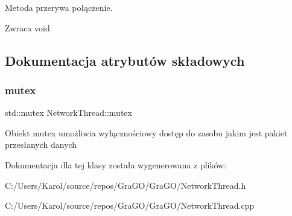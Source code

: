 Metoda przerywa połączenie. 

\begin{DoxyReturn}{Zwraca}
void 
\end{DoxyReturn}


\subsection{Dokumentacja atrybutów składowych}
\mbox{\label{class_network_thread_ab970cd7721c0a8d5189cc8d32f0c512f}} 
\subsubsection{mutex}
{\footnotesize\ttfamily std\+::mutex Network\+Thread\+::mutex}

Obiekt mutex umożliwia wyłącznościowy dostęp do zasobu jakim jest pakiet przesłanych danych 

Dokumentacja dla tej klasy została wygenerowana z plików\+:\begin{DoxyCompactItemize}
\item 
C\+:/\+Users/\+Karol/source/repos/\+Gra\+G\+O/\+Gra\+G\+O/Network\+Thread.\+h\item 
C\+:/\+Users/\+Karol/source/repos/\+Gra\+G\+O/\+Gra\+G\+O/Network\+Thread.\+cpp\end{DoxyCompactItemize}
